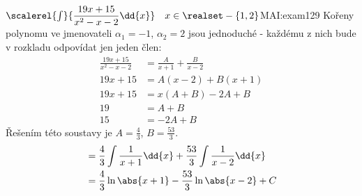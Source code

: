 \begin{mathexam}{\(\scalerel{\int}{\dfrac{19x+15}{x^2-x-2}\dd{x}} \quad x\in
  \realset-\{1,2\}\)}{MAI:exam129} 
  Kořeny polynomu ve jmenovateli $\alpha_1 = -1$, $\alpha_2 = 2$ jsou jednoduché - každému z nich
  bude v rozkladu odpovídat jen jeden člen: 
    \begin{align*}
      \frac{19x+15}{x^2-x-2}      &= \frac{A}{x+1} + \frac{B}{x-2} \\
                        19x +15   &= A(x-2) + B(x+1)               \\
                        19x +15   &= x(A+B) - 2A + B               \\
                        19        &= A + B                         \\
                             15   &=        - 2A + B
    \end{align*}              
    Řešením této soustavy je \(A = \frac{4}{3}\), \(B = \frac{53}{3}\).
    \begin{align*}
      &= \frac{4}{3}\int{\frac{1}{x+1}}\dd{x} + \frac{53}{3}\int{\frac{1}{x-2}}\dd{x}  \\
      &= \frac{4}{3}\ln\abs{x+1} - \frac{53}{3}\ln\abs{x-2} +  C
    \end{align*}   
\end{mathexam}